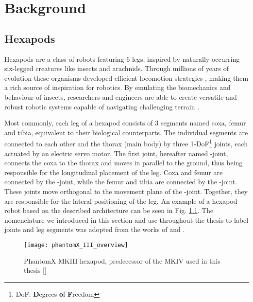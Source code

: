 \chapter{Background}
\label{ch:background}

\section{Hexapods} \label{sec: Hexapods}
Hexapods are a class of robots featuring 6 legs, inspired by naturally occurring six-legged creatures like insects and arachnids.
Through millions of years of evolution these organisms developed efficient locomotion strategies \parencite{neville2006bipedal}, making them a rich source of inspiration for robotics.
By emulating the biomechanics and behaviour of insects, researchers and engineers are able to create versatile and robust robotic systems capable of navigating challenging terrain \parencite{irawan2011optimal, ouyang2021adaptive, schilling2013walknet}.

Most commonly, each leg of a hexapod consists of 3 segments named coxa, femur and tibia, equivalent to their biological counterparts.
The individual segments are connected to each other and the thorax (main body) by three 1-DoF\footnote{DoF: \textbf{D}egrees \textbf{o}f \textbf{F}reedom} joints, each actuated by an electric servo motor.
The first joint, hereafter named \textalpha-joint, connects the coxa to the thorax and moves in parallel to the ground, thus being responsible for the longitudinal placement of the leg.
Coxa and femur are connected by the \textbeta-joint, while the femur and tibia are connected by the \textgamma-joint. 
These joints move orthogonal to the movement plane of the \textalpha-joint. Together, they are responsible for the lateral positioning of the leg.
An example of a hexapod robot based on the described architecture can be seen in Fig. \ref{figure: PhantomX MKIII}.
The nomenclature we introduced in this section and use throughout the thesis to label joints and leg segments was adopted from the works of 
\cite{schilling2013walknet} and \cite{HeterarchicalArchitectureSchilling}.

\begin{figure}[h]
	\centerline{\texttt{[image: phantomX\_III\_overview]}}
	\caption{PhantomX MKIII hexapod, predecessor of the MKIV used in this thesis [\cite{PhantomX_MKIII}]}
	\label{figure: PhantomX MKIII}
\end{figure}


